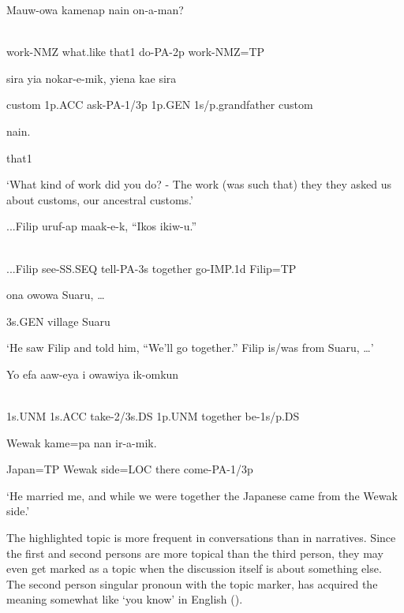 \ea%
\label{ex:x1680}
\gll Mauw-owa  kamenap  nain  on-a-man?   \\
      \\
\glt
\z

work-NMZ  what.like  that1  do-PA-2p  work-NMZ=TP

sira  yia  nokar-e-mik,  yiena  kae  sira

custom  1p.ACC  ask-PA-1/3p  1p.GEN  1s/p.grandfather  custom

nain.

that1

`What kind of work did you do? - The work (was such that) they they asked us about customs, our ancestral customs.'

\ea%
\label{ex:x1678}
\gll ...Filip  uruf-ap  maak-e-k,  ``Ikos  ikiw-u.''   \\
      \\
\glt
\z

...Filip  see-SS.SEQ  tell-PA-3s  together  go-IMP.1d  Filip=TP

ona  owowa  Suaru,  {\dots}

3s.GEN  village  Suaru

`He saw Filip and told him, ``We'll go together.'' Filip is/was from Suaru, {\dots}'

\ea%
\label{ex:x1679}
\gll Yo  efa  aaw-eya  i  owawiya  ik-omkun  \\
      \\
\glt
\z

1s.UNM  1s.ACC  take-2/3s.DS  1p.UNM  together  be-1s/p.DS

  Wewak  kame=pa  nan  ir-a-mik.

Japan=TP  Wewak  side=LOC  there  come-PA-1/3p

`He married me, and while we were together the Japanese came from the Wewak side.'

The highlighted topic is more frequent in conversations than in narratives. Since the first and second persons are more topical than the third person, they may even get marked as a topic when the discussion itself is about something else. The second person singular pronoun with the topic marker,  has acquired the meaning somewhat like `you know' in English ().

